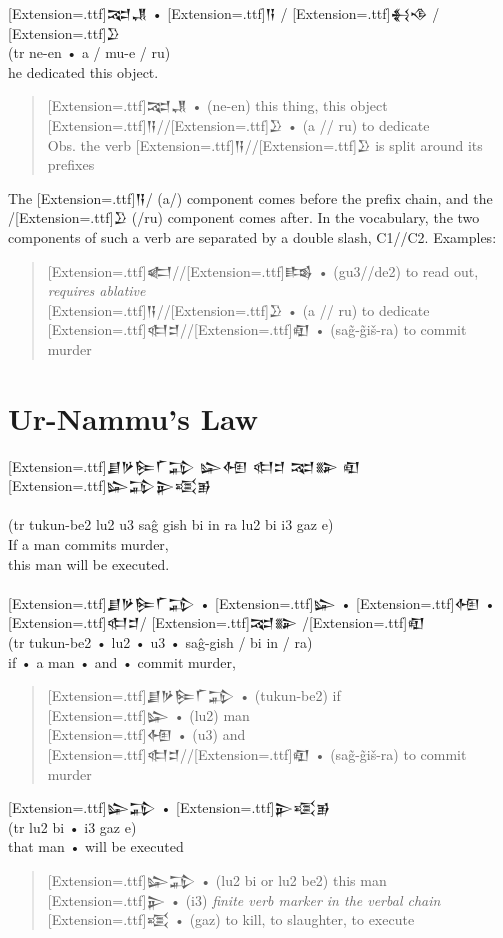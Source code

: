 \documentclass[a4paper,12pt]{book}
\newcommand{\fcn}{\setmainfont{Akkadian}[Extension=.ttf]}
\newcommand{\fcm}{\large\setmainfont{Akkadian}[Extension=.ttf]}
\newcommand{\fsm}{\Large\setmainfont{Akkadian}[Extension=.ttf]}
\begin{document}
\newpage
\noindent
{\fcm 𒉈𒂗} • {\fcm 𒀀} / {\fcm 𒈬𒈾} / {\fcm 𒊒}\\
(tr ne-en • a / mu-e / ru)\\ 
he dedicated this object.\\
\begin{quote}
{\fcm 𒉈𒂗} • (ne-en) this thing, this object\\
{\fcm 𒀀}//{\fcm 𒊒} • (a // ru) to dedicate\\
Obs. the verb {\fcn 𒀀}//{\fcn 𒊒} is split around its prefixes
\end{quote}
The {\fcn 𒀀}/ (a/) component comes before the prefix chain,
and the /{\fcn 𒊒} (/ru) component comes after.
In the vocabulary, the two components
of such a verb are separated by a double
slash, C1//C2. Examples:
\begin{quote}
{\fcm 𒅗}//{\fcm 𒌤} • (gu3//de2) to read out,
  {\em requires ablative}\\
{\fcm 𒀀}//{\fcm 𒊒} • (a // ru) to dedicate\\
{\fcm 𒊕𒄑}//{\fcm 𒊏} • (sag̃-g̃iš-ra) to commit murder
\end{quote}

\section*{Ur-Nammu's Law}
\noindent
{\fsm 𒋗𒃻𒌉𒇲𒁉 𒇽𒅇 𒊕𒄑 𒉈𒅔 𒊏}\\
{\fsm 𒇽𒁉𒉌𒄤𒂊}\\
\verb||\\
(tr tukun-be2 lu2 u3 saĝ gish bi in ra lu2 bi i3 gaz e)\\
If a man commits murder,\\
this man will be executed.\\

\verb||\\
{\fcm 𒋗𒃻𒌉𒇲𒁉} • {\fcm 𒇽} • {\fcm 𒅇}
     • {\fcm 𒊕𒄑}/ {\fcm 𒉈𒅔} /{\fcm 𒊏}\\
(tr tukun-be2 • lu2 • u3 • saĝ-gish / bi in / ra)\\
if • a man • and • commit murder,\\
\begin{quote}  
{\fcm 𒋗𒃻𒌉𒇲𒁉} • (tukun-be2) if\\
{\fcm 𒇽} • (lu2) man\\
{\fcm 𒅇} • (u3) and\\
{\fcm 𒊕𒄑}//{\fcm 𒊏} • (sag̃-g̃iš-ra) to commit murder
\end{quote}

\newpage
\noindent
{\fcm 𒇽𒁉} • {\fcm 𒉌𒄤𒂊}\\
(tr lu2 bi • i3 gaz e)\\
that man • will be executed\\
\begin{quote}
{\fcm 𒇽𒁉} • (lu2 bi or lu2 be2) this man\\
{\fcm 𒉌} • (i3) {\em finite verb marker in the verbal chain}\\
{\fcm 𒄤} • (gaz) to kill, to slaughter, to execute
\end{quote}
\end{document}
